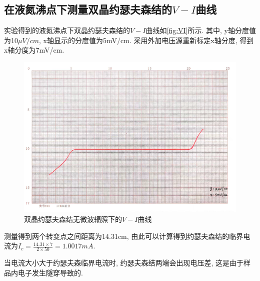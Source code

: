 \documentclass[font=default]{mpltx}
\begin{document}
  \subsection{在液氮沸点下测量双晶约瑟夫森结的$V-I$曲线}
  实验得到的液氮沸点下双晶约瑟夫森结的$V-I$曲线如\autoref{fig:VI}所示. 其中, y轴分度值为10$\mu V/cm$, x轴显示的分度值为5mV/cm.
  采用外加电压源重新标定x轴分度, 得到x轴分度为7mV/cm.
   \begin{figure}[htbp]
    \centering
    \includegraphics[width=0.85\linewidth]{fig/4.jpg}
    \caption{双晶约瑟夫森结无微波辐照下的$V-I$曲线}
    \label{fig:VI}
  \end{figure}

  测量得到两个转变点之间距离为14.31cm, 由此可以计算得到约瑟夫森结的临界电流为$I_c=\frac{14.31\times 7}{2\times 50}=1.0017mA$.

  \par
  当电流大小大于约瑟夫森临界电流时, 约瑟夫森结两端会出现电压差, 这是由于样品内电子发生隧穿导致的.
\end{document}
